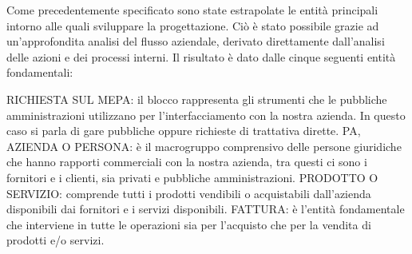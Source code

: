 Come precedentemente specificato sono state estrapolate le entità principali intorno alle quali sviluppare la progettazione. Ciò è stato possibile grazie ad un'approfondita analisi del flusso aziendale, derivato direttamente dall'analisi delle azioni e dei processi interni.\newline
Il risultato è dato dalle cinque seguenti entità fondamentali: \newline

\noindent{}

RICHIESTA SUL MEPA: il blocco rappresenta gli strumenti che le pubbliche amministrazioni utilizzano per  l'interfacciamento con la nostra azienda. In questo caso si parla di gare pubbliche oppure richieste di trattativa dirette. 
PA, AZIENDA O PERSONA: è il macrogruppo comprensivo delle persone giuridiche che hanno rapporti commerciali con la nostra azienda, tra questi ci sono i fornitori e i clienti, sia privati e pubbliche amministrazioni.
PRODOTTO O SERVIZIO: comprende tutti i prodotti vendibili o acquistabili dall'azienda disponibili dai fornitori e i servizi disponibili.
FATTURA: è l'entità fondamentale che interviene in tutte le operazioni sia per l'acquisto che per la vendita di prodotti e/o servizi.




